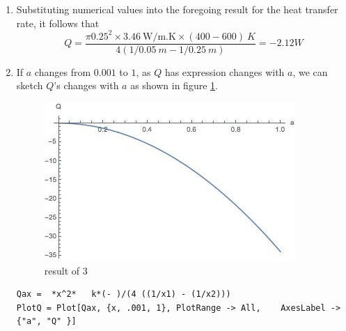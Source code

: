 \begin{solution}
\begin{enumerate}
\item
Substituting numerical values into the foregoing result for the heat 
transfer rate, it follows that
$$Q=\frac{\pi 0.25^2\times3.46~\text{W/m.K}\times(400-600)~K}{4(1/0.05~m - 1/0.25~m)}=-2.12W$$
\item
If $a$ changes from $0.001$ to $1$, as $Q$ has expression changes with $a$,
we can sketch $Q$’s changes with $a$ as shown in figure \ref{fig:2:5}.
\begin{figure}[h!]
  \centering
    \includegraphics[scale=0.8]{figures/ch2/5}
    \caption{result of 3}
    \label{fig:2:5}
\end{figure}
\begin{lstlisting}
Qax =  *x^2*   k*(- )/(4 ((1/x1) - (1/x2)))
PlotQ = Plot[Qax, {x, .001, 1}, PlotRange -> All,    AxesLabel -> {"a", "Q" }]
\end{lstlisting}
\end{enumerate}
\end{solution}

